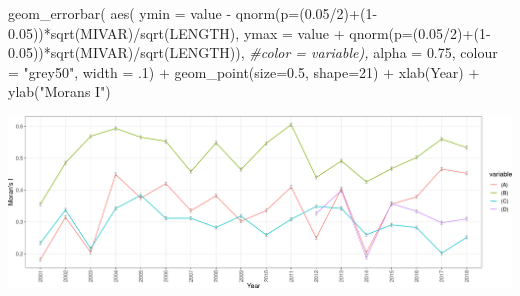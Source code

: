 \documentclass[10pt,landscape,a3paper]{article}
\newenvironment{Shaded}{\begin{snugshade}}{\end{snugshade}}
\newcommand{\AttributeTok}[1]{\textcolor[rgb]{0.77,0.63,0.00}{#1}}
\newcommand{\CommentTok}[1]{\textcolor[rgb]{0.56,0.35,0.01}{\textit{#1}}}
\newcommand{\DecValTok}[1]{\textcolor[rgb]{0.00,0.00,0.81}{#1}}
\newcommand{\FloatTok}[1]{\textcolor[rgb]{0.00,0.00,0.81}{#1}}
\newcommand{\FunctionTok}[1]{\textcolor[rgb]{0.00,0.00,0.00}{#1}}
\newcommand{\NormalTok}[1]{#1}
\newcommand{\SpecialCharTok}[1]{\textcolor[rgb]{0.00,0.00,0.00}{#1}}
\newcommand{\StringTok}[1]{\textcolor[rgb]{0.31,0.60,0.02}{#1}}
\begin{document}
\begin{Shaded}
\begin{Highlighting}[]
  \FunctionTok{geom\_errorbar}\NormalTok{(}
    \FunctionTok{aes}\NormalTok{(}
      \AttributeTok{ymin =}\NormalTok{ value }\SpecialCharTok{{-}} \FunctionTok{qnorm}\NormalTok{(}\AttributeTok{p=}\NormalTok{(}\FloatTok{0.05}\SpecialCharTok{/}\DecValTok{2}\NormalTok{)}\SpecialCharTok{+}\NormalTok{(}\DecValTok{1}\FloatTok{{-}0.05}\NormalTok{))}\SpecialCharTok{*}\FunctionTok{sqrt}\NormalTok{(MIVAR)}\SpecialCharTok{/}\FunctionTok{sqrt}\NormalTok{(LENGTH),}
      \AttributeTok{ymax =}\NormalTok{ value }\SpecialCharTok{+} \FunctionTok{qnorm}\NormalTok{(}\AttributeTok{p=}\NormalTok{(}\FloatTok{0.05}\SpecialCharTok{/}\DecValTok{2}\NormalTok{)}\SpecialCharTok{+}\NormalTok{(}\DecValTok{1}\FloatTok{{-}0.05}\NormalTok{))}\SpecialCharTok{*}\FunctionTok{sqrt}\NormalTok{(MIVAR)}\SpecialCharTok{/}\FunctionTok{sqrt}\NormalTok{(LENGTH)),}
      \CommentTok{\#color = variable),}
    \AttributeTok{alpha =} \FloatTok{0.75}\NormalTok{,}
    \AttributeTok{colour =} \StringTok{"grey50"}\NormalTok{,}
    \AttributeTok{width =}\NormalTok{ .}\DecValTok{1}\NormalTok{) }\SpecialCharTok{+}
  \FunctionTok{geom\_point}\NormalTok{(}\AttributeTok{size=}\FloatTok{0.5}\NormalTok{, }\AttributeTok{shape=}\DecValTok{21}\NormalTok{) }\SpecialCharTok{+} 
  \FunctionTok{xlab}\NormalTok{(}\StringTok{\textquotesingle{}Year\textquotesingle{}}\NormalTok{) }\SpecialCharTok{+}
  \FunctionTok{ylab}\NormalTok{(}\StringTok{"Moran\textquotesingle{}s I"}\NormalTok{)}
\end{Highlighting}
\end{Shaded}

\begin{center}\includegraphics{img/modelling/transformations-2} \end{center}
\end{document}
